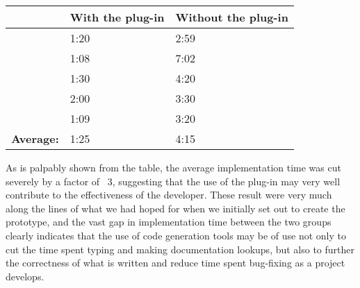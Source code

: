 \begin{center}
\begin{tabular}{|l|l|l|}
    \hline
    ~        & {\bf With the plug-in} & {\bf Without the plug-in} \\ \hline
    ~        & 1:20             & 2:59                \\ \hline
    ~        & 1:08             & 7:02                \\ \hline
    ~        & 1:30             & 4:20                \\ \hline
    ~        & 2:00             & 3:30                \\ \hline
    ~        & 1:09             & 3:20                   \\ \hline
    {\bf Average:} & 1:25             & 4:15                \\ \hline
\end{tabular}
\end{center}

As is palpably shown from the table, the average implementation time was cut severely by a factor of ~3, suggesting that the use of the plug-in may very well contribute to the effectiveness of the developer. These result were very much along the lines of what we had hoped for when we initially set out to create the prototype, and the vast gap in implementation time between the two groups clearly indicates that the use of code generation tools may be of use not only to cut the time spent typing and making documentation lookups, but also to further the correctness of what is written and reduce time spent bug-fixing as a project develops. %









